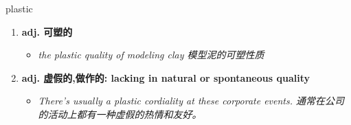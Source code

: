 
\begin{frame}
{\huge plastic}
\begin{center}
\begin{enumerate}\Large
  \item \textbf{adj. 可塑的}
  \begin{itemize}
    \item \em{\Large{the plastic quality of modeling clay 模型泥的可塑性质}}
  \end{itemize}
  \item \textbf{adj. 虚假的,做作的: lacking in natural or spontaneous quality}
  \begin{itemize}
    \item \em{\Large{There's usually a plastic cordiality at these corporate events. 通常在公司的活动上都有一种虚假的热情和友好。}}
  \end{itemize}
\end{enumerate}
\end{center}
\end{frame}
